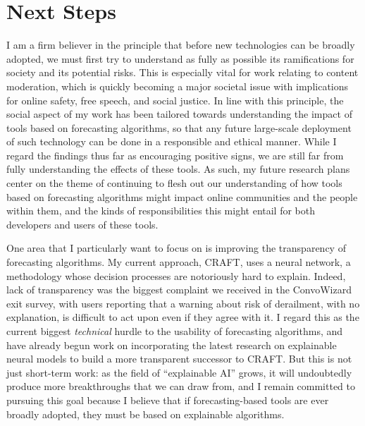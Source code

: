 \documentclass[11pt,letterpaper]{article}
\begin{document}
\section{Next Steps}
I am a firm believer in the principle that before new technologies can be broadly adopted, we must first try to understand as fully as possible its ramifications for society and its potential risks.
This is especially vital for work relating to content moderation, which is quickly becoming a major societal issue with implications for online safety, free speech, and social justice.
In line with this principle, the social aspect of my work has been tailored towards understanding the impact of tools based on forecasting algorithms, so that any future large-scale deployment of such technology can be done in a responsible and ethical manner.
While I regard the findings thus far as encouraging positive signs, we are still far from fully understanding the effects of these tools.
As such, my future research plans center on the theme of continuing to flesh out our understanding of how tools based on forecasting algorithms might impact online communities and the people within them, and the kinds of responsibilities this might entail for both developers and users of these tools.

One area that I particularly want to focus on is improving the transparency of forecasting algorithms.
My current approach, CRAFT, uses a neural network, a methodology whose decision processes are notoriously hard to explain.
Indeed, lack of transparency was the biggest complaint we received in the ConvoWizard exit survey, with users reporting that a warning about risk of derailment, with no explanation, is difficult to act upon even if they agree with it.
I regard this as the current biggest \emph{technical} hurdle to the usability of forecasting algorithms, and have already begun work on incorporating the latest research on explainable neural models to build a more transparent successor to CRAFT.
But this is not just short-term work: as the field of ``explainable AI'' grows, it will undoubtedly produce more breakthroughs that we can draw from, and I remain committed to pursuing this goal because I believe that if forecasting-based tools are ever broadly adopted, they must be based on explainable algorithms.
\end{document}
